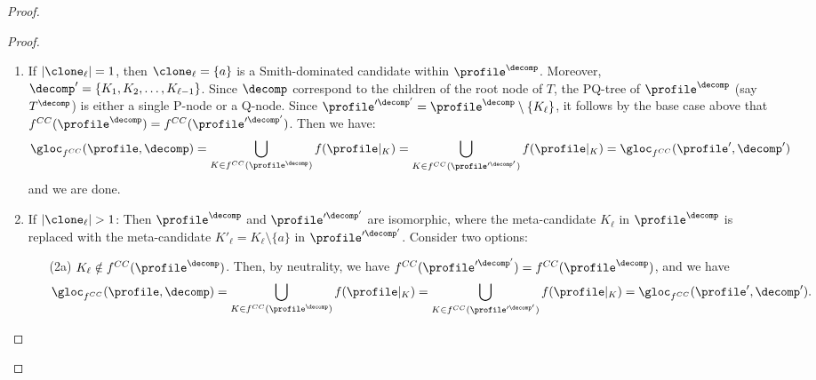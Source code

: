 \begin{proof}
\begin{proof}
    \begin{enumerate}
        \item If $|\clone_\ell| = 1$, then $\clone_\ell=\{a\}$ is a Smith-dominated candidate within $\profile^\decomp$. Moreover, $\decomp'= \{K_1,K_2,\ldots,K_{\ell-1}\}$. Since $\decomp$ correspond to the children of the root node of $T$, the PQ-tree of $\profile^\decomp$ (say $T^\decomp$) is either a single P-node or a Q-node. Since $\profile'^{\decomp'}= \profile^{\decomp} \setminus \{K_\ell\}$, it follows by the base case above that $f^{CC}(\profile^{\decomp}) = f^{CC}(\profile'^{\decomp'})$. Then we have:
        \begin{align*}
            \gloc_{f^{CC}}(\profile, \decomp) = \bigcup_{K \in f^{CC}(\profile^{\decomp}) } f(\profile|_{K})=\bigcup_{K \in f^{CC}(\profile'^{\decomp'}) } f(\profile|_{K})= \gloc_{f^{CC}}(\profile', \decomp')
        \end{align*}
        and we are done.
        \item If $|\clone_\ell| > 1$: Then $\profile^\decomp$ and $\profile'^{\decomp'}$ are isomorphic, where the meta-candidate $K_\ell$ in  $\profile^\decomp$ is replaced with the meta-candidate $K'_\ell=K_\ell \setminus
        \{a\}$ in $\profile'^{\decomp'}$. Consider two options: 
        \begin{enumerate}
            \item[(2a)] $K_\ell \notin f^{CC}(\profile^\decomp)$. Then, by neutrality, we have $f^{CC}(\profile'^{\decomp'})=f^{CC}(\profile^\decomp)$, and we have
            \begin{align*}
            \gloc_{f^{CC}}(\profile, \decomp) = \bigcup_{K \in f^{CC}(\profile^{\decomp}) } f(\profile|_{K})=\bigcup_{K \in f^{CC}(\profile'^{\decomp'}) } f(\profile|_{K})= \gloc_{f^{CC}}(\profile', \decomp').
            \end{align*}


\end{enumerate}
\end{enumerate}
\end{proof}
\end{proof}
